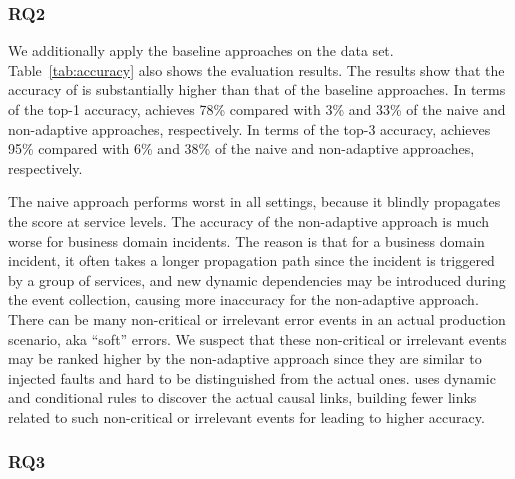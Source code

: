 \subsubsection{RQ2}

\label{sec:rq2}

We additionally apply the baseline approaches on the  data set. Table~\ref{tab:accuracy} also shows the evaluation results. The results show that the accuracy of \system is substantially higher than that of the baseline approaches. In terms of the top-1 accuracy, \system achieves 78\% compared with 3\% and 33\% of the naive and non-adaptive approaches, respectively.  In terms of the top-3 accuracy, \system achieves 95\% compared with 6\% and 38\% of the naive and non-adaptive approaches, respectively. 

The naive approach performs worst in all settings, because it blindly propagates the score at service levels.
The accuracy of the non-adaptive approach is much worse for business domain incidents. The reason is that for a business domain incident, it often takes a longer propagation path since the incident is triggered by a group of services, and new dynamic dependencies may be introduced during the event collection, causing more inaccuracy for the non-adaptive approach. %
There can be many non-critical or irrelevant error events in an actual production scenario, aka ``soft'' errors. We suspect that these non-critical or irrelevant events may be ranked higher by the non-adaptive approach since they are similar to injected faults and hard to be distinguished from the actual ones. \system uses dynamic and conditional rules to discover the actual causal links, building fewer links related to such non-critical or irrelevant events for leading to higher accuracy.  

\subsubsection{RQ3}

